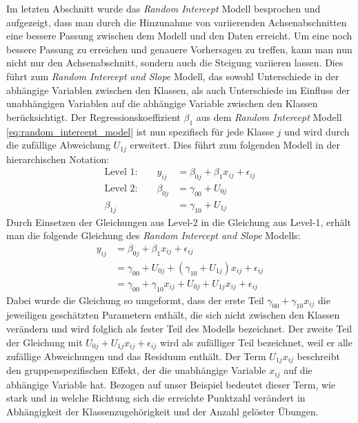 \documentclass[12pt]{article}\usepackage[]{graphicx}\usepackage[]{color}
\begin{document}
Im letzten Abschnitt wurde das \textit{Random Intercept} Modell besprochen und aufgezeigt, dass man durch die Hinzunahme von variierenden Achsenabschnitten eine bessere Passung zwischen dem Modell und den Daten erreicht. Um eine noch bessere Passung zu erreichen und genauere Vorhersagen zu treffen, kann man nun nicht nur den Achsenabschnitt, sondern auch die Steigung variieren lassen. Dies führt zum \textit{Random Intercept and Slope} Modell, das sowohl Unterschiede in der abhängige Variablen zwischen den Klassen, als auch Unterschiede im Einfluss der unabhängigen Variablen auf die abhängige Variable zwischen den Klassen berücksichtigt. Der Regressionskoeffizient $\beta_{1}$ aus dem \textit{Random Intercept} Modell \eqref{eq:random_intercept_model} ist nun spezifisch für jede Klasse $j$ und wird durch die zufällige Abweichung $U_{1j}$ erweitert. Dies führt zum folgenden Modell in der hierarchischen Notation:
\begin{equation} \label{eq:random_intercept_slope_model}
\begin{split}	
 \text{Level 1:}  \qquad y_{ij} & = \beta_{0j} + \beta_{1}x_{ij} + \epsilon_{ij}\\
 \text{Level 2:} \qquad \beta_{0j} & = \gamma_{00} + U_{0j}\\
 \beta_{1j} & = \gamma_{10} + U_{1j}
\end{split}	
\end{equation} 
Durch Einsetzen der Gleichungen aus Level-2 in die Gleichung aus Level-1, erhält man die folgende Gleichung des \textit{Random Intercept and Slope} Modells:
\begin{equation} \label{eq:flat_random_intercept_slope_model}
\begin{split}	
y_{ij} & = \beta_{0j} + \beta_{1}x_{ij} + \epsilon_{ij}\\
& = \gamma_{00} + U_{0j} + (\gamma_{10} + U_{1j})x_{ij} + \epsilon_{ij}\\
& = \gamma_{00} + \gamma_{10}x_{ij} + U_{0j} + U_{1j}x_{ij} + \epsilon_{ij}
\end{split}	
\end{equation} 
Dabei wurde die Gleichung so umgeformt, dass der erste Teil $\gamma_{00} + \gamma_{10}x_{ij}$ die jeweiligen geschätzten Parametern enthält, die sich nicht zwischen den Klassen verändern und wird folglich als fester Teil des Modells bezeichnet. Der zweite Teil der Gleichung mit $U_{0j} + U_{1j}x_{ij} + \epsilon_{ij}$ wird als zufälliger Teil bezeichnet, weil er alle zufällige Abweichungen und das Residuum enthält. Der Term $U_{1j}x_{ij}$ beschreibt den gruppenspezifischen Effekt, der die unabhängige Variable $x_{ij}$ auf die abhängige Variable hat. Bezogen auf unser Beispiel bedeutet dieser Term, wie stark und in welche Richtung sich die erreichte Punktzahl verändert in Abhängigkeit der Klassenzugehörigkeit und der Anzahl gelöster Übungen. 
\end{document}
